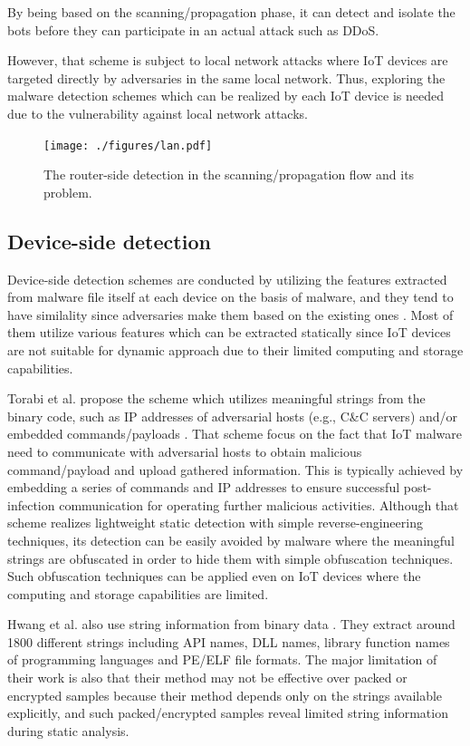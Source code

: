 \documentclass{ieeeaccess}
\begin{document}
By being based on the scanning/propagation phase, it can detect and isolate the bots before they can participate in an actual attack such as DDoS.

However, that scheme is subject to local network attacks where IoT devices are targeted directly by adversaries in the same local network.
Thus, exploring the malware detection schemes which can be realized by each IoT device is needed due to the vulnerability against local network attacks.

\begin{figure}[t]
 \centering
 \texttt{[image: ./figures/lan.pdf]}
 \caption{The router-side detection in the scanning/propagation flow and its problem.} 
 \label{fig:lan}
\end{figure}

\subsection{Device-side detection} 
Device-side detection schemes are conducted by utilizing the features extracted from malware file itself at each device on the basis of malware, and they tend to have similality since adversaries make them based on the existing ones \cite{om, hwang, cfg, cfg2}.
Most of them utilize various features which can be extracted statically since IoT devices are not suitable for dynamic approach due to their limited computing and storage capabilities.

Torabi et al. propose the scheme which utilizes meaningful strings from the binary code, such as IP addresses of adversarial hosts (e.g., C\&C servers) and/or embedded commands/payloads \cite{om}.
That scheme focus on the fact that IoT malware need to communicate with adversarial hosts to obtain malicious command/payload and upload gathered information.
This is typically achieved by embedding a series of commands and IP addresses to ensure successful post-infection communication for operating further malicious activities. 
Although that scheme realizes lightweight static detection with simple reverse-engineering techniques, its detection can be easily avoided by malware where the meaningful strings are obfuscated in order to hide them with simple obfuscation techniques.
Such obfuscation techniques can be applied even on IoT devices where the computing and storage capabilities are limited.

Hwang et al. also use string information from binary data \cite{hwang}.
They extract around 1800 different strings including API names, DLL names, library function names of programming languages and PE/ELF file formats.
The major limitation of their work is also that their method may not be effective over packed or encrypted samples because their method depends only on the strings available explicitly, and such packed/encrypted samples reveal limited string information during static analysis.
\end{document}
